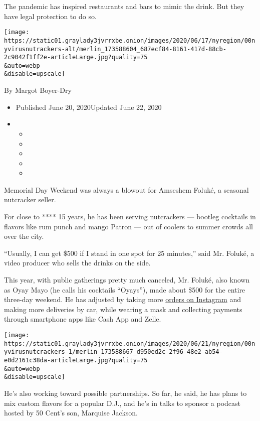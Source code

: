 The pandemic has inspired restaurants and bars to mimic the drink. But
they have legal protection to do so.

\texttt{[image: https://static01.graylady3jvrrxbe.onion/images/2020/06/17/nyregion/00nyvirusnutrackers-alt/merlin\_173588604\_687ecf84-8161-417d-88cb-2c9042f1ff2e-articleLarge.jpg?quality=75\\\&auto=webp\\\&disable=upscale]}

By Margot Boyer-Dry

\begin{itemize}
\item
  Published June 20, 2020Updated June 22, 2020
\item
  \begin{itemize}
  \item
  \item
  \item
  \item
  \item
  \end{itemize}
\end{itemize}

Memorial Day Weekend was always a blowout for Amseshem Foluké, a
seasonal nutcracker seller.

For close to **** 15 years, he has been serving nutcrackers --- bootleg
cocktails in flavors like rum punch and mango Patron --- out of coolers
to summer crowds all over the city.

``Usually, I can get \$500 if I stand in one spot for 25 minutes,'' said
Mr. Foluké, a video producer who sells the drinks on the side.

This year, with public gatherings pretty much canceled, Mr. Foluké, also
known as Oyay Mayo (he calls his cocktails ``Oyays''), made about \$500
for the entire three-day weekend. He has adjusted by taking more
\href{https://www.instagram.com/oyays/?igshid=1cqr3xooea2t2}{orders on
Instagram} and making more deliveries by car, while wearing a mask and
collecting payments through smartphone apps like Cash App and Zelle.

\texttt{[image: https://static01.graylady3jvrrxbe.onion/images/2020/06/21/nyregion/00nyvirusnutcrackers-1/merlin\_173588667\_d950ed2c-2f96-48e2-ab54-e0d2161c38da-articleLarge.jpg?quality=75\\\&auto=webp\\\&disable=upscale]}

He's also working toward possible partnerships. So far, he said, he has
plans to mix custom flavors for a popular D.J., and he's in talks to
sponsor a podcast hosted by 50 Cent's son, Marquise Jackson.

